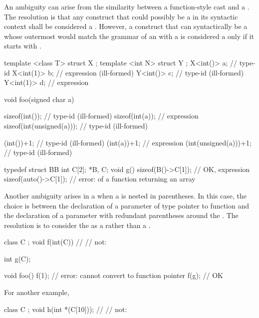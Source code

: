 \pnum
An ambiguity can arise from the similarity between a function-style
cast and a
.
The resolution is that any construct that could possibly be a
in its syntactic context shall be considered a
.
However, a construct that can syntactically be a 
whose outermost 
would match the grammar of an 
with a 
is considered a  only if it starts with .
\begin{example}
\begin{codeblock}
template <class T> struct X {};
template <int N> struct Y {};
X<int()> a;                     // type-id
X<int(1)> b;                    // expression (ill-formed)
Y<int()> c;                     // type-id (ill-formed)
Y<int(1)> d;                    // expression

void foo(signed char a) {
  sizeof(int());                // type-id (ill-formed)
  sizeof(int(a));               // expression
  sizeof(int(unsigned(a)));     // type-id (ill-formed)

  (int())+1;                    // type-id (ill-formed)
  (int(a))+1;                   // expression
  (int(unsigned(a)))+1;         // type-id (ill-formed)
}

typedef struct BB { int C[2]; } *B, C;
void g() {
  sizeof(B()->C[1]);            // OK, expression\tcode{)}
  sizeof(auto()->C[1]);         // error:  of a function returning an array
}
\end{codeblock}
\end{example}

\pnum
Another ambiguity arises in a
 when a
is nested in parentheses.
In this case, the choice is between the declaration of a parameter of type
pointer to function and the declaration of a parameter with redundant
parentheses around the
.
The resolution is to consider the
as a
rather than a
.
\begin{example}
\begin{codeblock}
class C { };
void f(int(C)) { }              // 
                                // not: 

int g(C);

void foo() {
  f(1);                         // error: cannot convert  to function pointer
  f(g);                         // OK
}
\end{codeblock}

For another example,
\begin{codeblock}
class C { };
void h(int *(C[10]));           // 
                                // not: 
\end{codeblock}
\end{example}

